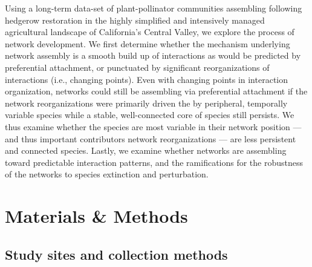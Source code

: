 \documentclass[12pt]{article}
\begin{document}
Using a long-term data-set of plant-pollinator communities assembling
following hedgerow restoration in the highly simplified and
intensively managed agricultural landscape of California's Central
Valley, we explore the process of network development. We first
determine whether the mechanism underlying network assembly is a
smooth build up of interactions as would be predicted by preferential
attachment, or punctuated by significant reorganizations of
interactions (i.e., changing points). Even with changing points in
interaction organization, networks could still be assembling via
preferential attachment if the network reorganizations were primarily
driven the by peripheral, temporally variable species while a stable,
well-connected core of species still persists. We thus examine whether
the species are most variable in their network position --- and thus
important contributors network reorganizations --- are less persistent
and connected species.  Lastly, we examine whether networks are
assembling toward predictable interaction patterns, and the
ramifications for the robustness of the networks to species extinction
and perturbation.


\section*{Materials \& Methods}
\label{sec:methods}

\subsection*{Study sites and collection methods}
\label{sec:study-sites}
\end{document}
